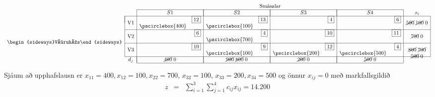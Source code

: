\begin{lausn}
\begin{description}
\begin{center}
\[ \begin{array}{cccr|cr|cr|crcc}
 & & \multicolumn{8}{c}{\mbox{Smásalar}} \\ \cline{3-10}
 & & \multicolumn{2}{|c|}{S1} & \multicolumn{2}{|c|}{S2} & \multicolumn{2}{|c|}{S3}& \multicolumn{2}{|c|}{S4} & s_i \\ \cline{2-11}
\multicolumn{1}{c|}{\multirow{8}{*}{\begin{sideways}Vöruhús\end{sideways}}} 
& \multicolumn{1}{|c|}{\multirow{2}{*}{V1}} &   & \scriptscriptstyle{\fbox{12}}&    & \scriptscriptstyle{\fbox{13}} & & \scriptscriptstyle{\fbox{4}}& & \scriptscriptstyle{\fbox{6}} & \multicolumn{1}{|c|}{\multirow{2}{*}{\cancel{500}\;\cancel{100}\;0}}  \\ 
& \multicolumn{1}{|c|}{                  } & \pscirclebox{400} & & \pscirclebox{100}&    & &   & & & \multicolumn{1}{|c|}{}\\ \cline{2-11}
& \multicolumn{1}{|c|}{\multirow{2}{*}{V2}} &   & \scriptscriptstyle{\fbox{6}}&    & \scriptscriptstyle{\fbox{4}} & & \scriptscriptstyle{\fbox{10}}& & \scriptscriptstyle{\fbox{11}} & \multicolumn{1}{|c|}{\multirow{2}{*}{\cancel{700}\;0}}  \\ 
& \multicolumn{1}{|c|}{                  } &  &    & \pscirclebox{700}&    & & &&   & \multicolumn{1}{|c|}{}\\ \cline{2-11}
& \multicolumn{1}{|c|}{\multirow{2}{*}{V3}} &   & \scriptscriptstyle{\fbox{10}}&    & \scriptscriptstyle{\fbox{9}} &  & \scriptscriptstyle{\fbox{12}} & & \scriptscriptstyle{\fbox{4}} & \multicolumn{1}{|c|}{\multirow{2}{*}{\cancel{800}\;\cancel{700}}} \\ 
& \multicolumn{1}{|c|}{                  } &   &    & \pscirclebox{100}&    & \pscirclebox{200}&   & \pscirclebox{500}& & \multicolumn{1}{|c|}{\multirow{2}{*}{\cancel{500}\;0}}\\ \cline{2-11}
&  \multicolumn{1}{c|}{d_j}& \multicolumn{2}{|c|}{\cancel{400}\;0} & \multicolumn{2}{|c|}{\cancel{900}\;\cancel{800}\;0} & \multicolumn{2}{|c|}{\cancel{200}\;0} &\multicolumn{2}{|c|}{\cancel{500}\;0} & \\ \cline{3-10}
\end{array}
\]
\end{center}

Sjáum að upphafslausn er $x_{11}=400,x_{12}=100,x_{22}=700$, \mbox{$x_{32}=100$}, $x_{33}=200,x_{34}=500$ og önnur $x_{ij}=0$ með markfallsgildið
\begin{eqnarray*}
z&=&\sum_{i=1}^3\sum_{j=1}^4 c_{ij}x_{ij}=%
14.200 
\end{eqnarray*}


\end{description}
\end{lausn}
